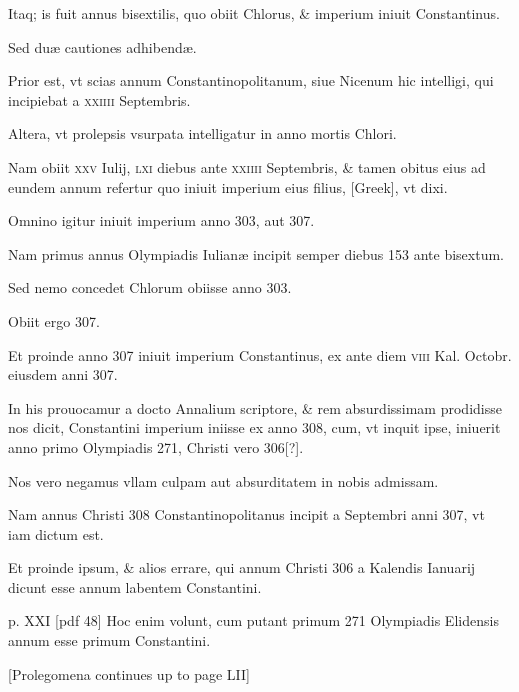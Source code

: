 \begin{parnumbers}
Itaq; is fuit annus bisextilis,
quo obiit Chlorus, \& imperium iniuit Constantinus.

Sed duæ
cautiones adhibendæ.

Prior est, vt scias annum Constantinopolitanum,
siue Nicenum hic intelligi, qui incipiebat a \textsc{xxiiii} Septembris.

Altera, vt prolepsis vsurpata intelligatur in anno mortis Chlori.

Nam obiit \textsc{xxv} Iulij, \textsc{lxi} diebus ante
\textsc{xxiiii} Septembris, \&
tamen obitus eius ad eundem annum refertur quo iniuit imperium
eius filius, \textgreek{[Greek]}, vt dixi.

Omnino igitur iniuit imperium anno
303, aut 307.

Nam primus annus Olympiadis Iulianæ incipit semper
diebus 153 ante bisextum.

Sed nemo concedet Chlorum obiisse
anno 303.

Obiit ergo 307.

Et proinde anno 307 iniuit imperium
Constantinus, ex ante diem \textsc{viii} Kal. Octobr. eiusdem anni 307.

In his prouocamur a docto Annalium scriptore, \& rem absurdissimam
prodidisse nos dicit, Constantini imperium iniisse ex anno
308, cum, vt inquit ipse, iniuerit anno primo Olympiadis 271,
Christi vero 306[?].

Nos vero negamus vllam culpam aut absurditatem
in nobis admissam.

Nam annus Christi 308 Constantinopolitanus
incipit a Septembri anni 307, vt iam dictum est.

Et proinde ipsum, \& alios errare, qui annum Christi 306 a Kalendis Ianuarij
dicunt esse annum labentem Constantini.

\clearpage
p. XXI [pdf 48]
Hoc enim volunt,
cum putant primum 271 Olympiadis Elidensis annum esse primum
Constantini.

[Prolegomena continues up to page LII]

\end{parnumbers}
